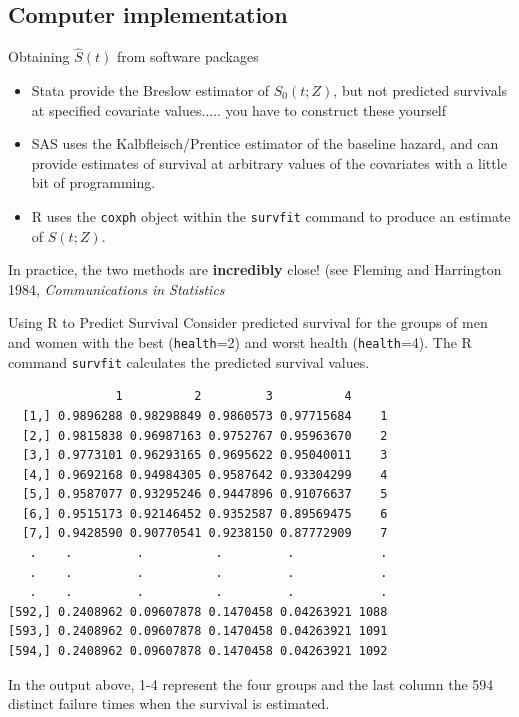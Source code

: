 \documentclass[envcountsect, 10pt, portrait, palatino]{beamer}
\begin{document}
\subsection{Computer implementation}
\begin{frame}{ Obtaining $\hat{S}(t)$ from software packages}
\begin{itemize}
\item  Stata provide the Breslow estimator of $S_0(t;Z)$, but
not predicted survivals at specified covariate values..... you
have to construct these yourself
\item  SAS uses the Kalbfleisch/Prentice estimator of the
baseline hazard, and can provide estimates of survival at
arbitrary values of the covariates with a little bit of
programming.
\item R uses the {\tt coxph} object within the {\tt survfit} command to produce an estimate
of $S(t;Z)$. 
\end{itemize}

In practice, the two methods are {\bf incredibly} close! (see  Fleming and
Harrington 1984, {\em Communications in Statistics}
\end{frame}
\begin{frame}[fragile]{Using R to Predict Survival}
Consider predicted survival for the groups of men and women with the best ({\tt health}=2) and worst health ({\tt health}=4). 
The R command {\tt survfit} calculates the predicted survival values.

\scriptsize
\begin{verbatim}
               1          2         3          4
  [1,] 0.9896288 0.98298849 0.9860573 0.97715684    1
  [2,] 0.9815838 0.96987163 0.9752767 0.95963670    2
  [3,] 0.9773101 0.96293165 0.9695622 0.95040011    3
  [4,] 0.9692168 0.94984305 0.9587642 0.93304299    4
  [5,] 0.9587077 0.93295246 0.9447896 0.91076637    5
  [6,] 0.9515173 0.92146452 0.9352587 0.89569475    6
  [7,] 0.9428590 0.90770541 0.9238150 0.87772909    7
   .    .         .          .         .            .
   .    .         .          .         .            .
   .    .         .          .         .            .
[592,] 0.2408962 0.09607878 0.1470458 0.04263921 1088
[593,] 0.2408962 0.09607878 0.1470458 0.04263921 1091
[594,] 0.2408962 0.09607878 0.1470458 0.04263921 1092
\end{verbatim}
\normalsize
In the output above, 1-4 represent the four groups and the last column the 594 distinct failure times when the survival is estimated.
\end{frame}
\end{document}
